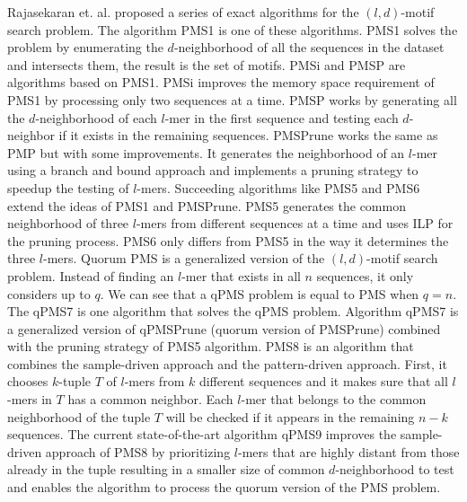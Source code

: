 	Rajasekaran et. al. proposed a series of exact algorithms for the $(l, d)$-motif search problem. The algorithm PMS1 \cite{ExactAlgorithmsPMS} is one of these algorithms. PMS1 solves the problem by enumerating the $d$-neighborhood of all the sequences in the dataset and intersects them, the result is the set of motifs. PMSi and PMSP \cite{Davila2006} are algorithms based on PMS1. PMSi improves the memory space requirement of PMS1 by processing only two sequences at a time. PMSP works by generating all the $d$-neighborhood of each $l$-mer in the first sequence and testing each $d$-neighbor if it exists in the remaining sequences. PMSPrune \cite{pms2007} works the same as PMP but with some improvements. It generates the neighborhood of an $l$-mer using a branch and bound approach and implements a pruning strategy to speedup the testing of $l$-mers. Succeeding algorithms like PMS5 \cite{Dinh2011} and PMS6 \cite{Shibdas2014} extend the ideas of PMS1 and PMSPrune. PMS5 generates the common neighborhood of three $l$-mers from different sequences at a time and uses ILP for the pruning process. PMS6 only differs from PMS5 in the way it determines the three $l$-mers. Quorum PMS is a generalized version of the $(l, d)$-motif search problem. Instead of finding an $l$-mer that exists in all $n$ sequences, it only considers up to $q$. We can see that a qPMS problem is equal to PMS when $q = n$. The qPMS7 \cite{Dinh2012} is one algorithm that solves the qPMS problem. Algorithm qPMS7 is a generalized version of qPMSPrune (quorum version of PMSPrune) combined with the pruning strategy of PMS5 algorithm. PMS8 \cite{pms2014} is an algorithm that combines the sample-driven approach and the pattern-driven approach. First, it chooses $k$-tuple $T$ of $l$-mers from $k$ different sequences and it makes sure that all $l$-mers in $T$ has a common neighbor. Each $l$-mer that belongs to the common neighborhood of the tuple $T$ will be checked if it appears in the remaining $n - k$ sequences. The current state-of-the-art algorithm qPMS9 \cite{pms2015} improves the sample-driven approach of PMS8 by prioritizing $l$-mers that are highly distant from those already in the tuple resulting in a smaller size of common $d$-neighborhood to test and enables the algorithm to process the quorum version of the PMS problem.

